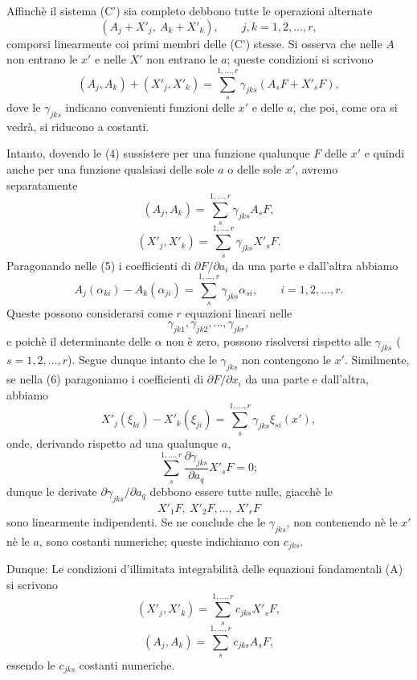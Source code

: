 \documentclass[11pt]{book}
\begin{document}
Affinchè il sistema (C') sia completo debbono tutte le operazioni alternate
\[
 (A_j+X'_j,\ A_k+X'_k),\qquad j,k=1,2,\ldots,r,
\]
comporsi linearmente coi primi membri delle (C') stesse. Si osserva che nelle $A$ non entrano le $x'$ e nelle $X'$ non entrano le $a$; queste condizioni si scrivono
\begin{equation*}\tag{4}
 (A_j,A_k)+(X'_j,X'_k)=\sum\limits_s^{1,\ldots,r} \gamma_{jks}(A_sF+X'_sF),
\end{equation*}
dove le $\gamma_{jks}$ indicano convenienti funzioni delle $x'$ e delle $a$, che poi, come ora si vedrà, si riducono a costanti.

Intanto, dovendo le (4) sussistere per una funzione qualunque $F$ delle $x'$ e quindi anche per una funzione qualsiasi delle sole $a$ o delle sole $x'$, avremo separatamente
\begin{equation*}\tag{5}
 (A_j,A_k)=\sum\limits_s^{1,\ldots,r} \gamma_{jks} A_sF,
\end{equation*}
\begin{equation*}\tag{6}
 (X'_j,X'_k)=\sum\limits_s^{1,\ldots,r} \gamma_{jks} X'_sF.
\end{equation*}
Paragonando nelle (5) i coefficienti di $\partial F/\partial a_i$ da una parte e dall'altra abbiamo
\[
 A_j(\alpha_{ki})-A_k(\alpha_{ji})=\sum\limits_s^{1,\ldots,r} \gamma_{jks}\alpha_{si},\qquad i=1,2,\ldots,r.
\]
Queste possono considerarsi come $r$ equazioni lineari nelle
\[
 \gamma_{jk1},\gamma_{jk2},\ldots,\gamma_{jkr},
\]
e poichè il determinante delle $\alpha$ non è zero, possono risolversi rispetto alle $\gamma_{jks}$ ($s=1,2,\ldots,r$). Segue dunque intanto che le $\gamma_{jks}$ non contengono le $x'$. Similmente, se nella (6) paragoniamo i coefficienti di $\partial F/\partial x_i$ da una parte e dall'altra, abbiamo
\[
 X'_j(\xi_{ki})-X'_k(\xi_{ji})=\sum\limits_s^{1,\ldots,r}\gamma_{jks}\xi_{si}(x'),
\]
onde, derivando rispetto ad una qualunque $a$,
\[
 \sum\limits_s^{1,\ldots,r}\frac{\partial\gamma_{jks}}{\partial a_q}X'_sF=0;
\]
dunque le derivate $\partial\gamma_{jks}/\partial a_q$ debbono essere tutte nulle, giacchè le
\[
 X'_1F,\ X'_2F,\ldots,\ X'_rF
\]
sono linearmente indipendenti. Se ne conclude che le $\gamma_{jks}$, non contenendo nè le $x'$ nè le $a$, sono costanti numeriche; queste indichiamo con $c_{jks}$.

Dunque: Le condizioni d'illimitata integrabilità delle equazioni fondamentali (A) si scrivono
\begin{equation*}\tag{$\alpha$}
 (X'_j,X'_k)=\sum\limits_s^{1,\ldots,r} c_{jks}X'_sF,
\end{equation*}
\begin{equation*}\tag{$\beta$}
 (A_j,A_k)=\sum\limits_s^{1,\ldots,r} c_{jks}A_sF,
\end{equation*}
essendo le $c_{jks}$ costanti numeriche.
\end{document}
